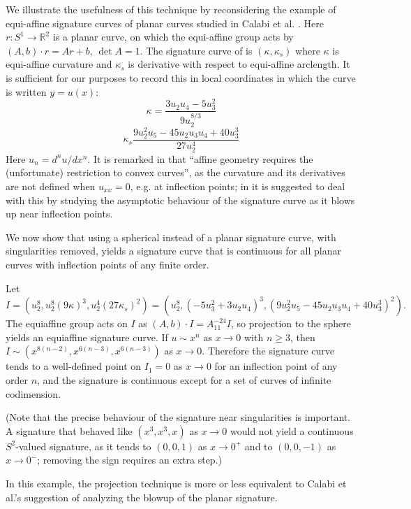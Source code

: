 \documentclass{article}
\def\R{\mathbb{R}}
\begin{document}
We illustrate the usefulness of this technique by reconsidering the example of equi-affine signature curves
of planar curves studied in Calabi et al. \cite{calabi}. Here $r\colon S^1\to\R^2$ is a planar curve, on 
which the equi-affine group acts by $(A,b)\cdot r = A r + b$, $\det A = 1$. The signature curve
of \cite{calabi} is $(\kappa,\kappa_s)$ where $\kappa$ is equi-affine curvature and $\kappa_s$
is derivative with respect to equi-affine arclength. It is sufficient for our purposes to record
this in local coordinates in which the curve is written $y=u(x)$:
$$\kappa = \frac{3 u_2 u_4 - 5 u_3^2}{9 u_2^{8/3}}$$
$$\kappa_s  \frac{9 u_2^2 u_5 - 45 u_2 u_3 u_4 + 40 u_3^3}{27 u_2^4}$$
Here $u_n = d^n u/dx^n$.
It is remarked in \cite{calabi}  that ``affine geometry requires the (unfortunate) restriction to convex curves'',
as the curvature and its derivatives are not defined when $u_{xx}=0$, e.g. at inflection points; in \cite{calabi} 
it is suggested to deal with this by studying the asymptotic behaviour of the signature curve as it blows
up near inflection points. 

We now show that using a spherical instead of a planar signature curve, with singularities removed,
yields a signature curve that is continuous for all planar curves with inflection points of any finite order.

Let
$$ I = (u_2^8, u_2^8(9\kappa)^3, u_2^4 (27\kappa_s)^2) = (u_2^8, (-5 u_3^2 + 3 u_2 u_4)^3,(9 u_2^2 u_5 - 45 u_2 u_3 u_4 + 40 u_3^3)^2).$$
The equiaffine group acts on $I$ as $(A,b)\cdot I = A_{11}^{-24}I$, so projection 
to the sphere yields an equiaffine signature curve. If $u\sim x^n$ as $x\to 0$ with $n\ge 3$, then
$I\sim(x^{8(n-2)}, x^{6(n-3)},x^{6(n-3)})$ as $x\to 0$. Therefore the signature curve
tends to a well-defined point on $I_1=0$ as $x\to 0$ for an inflection point
of any order $n$, and the signature is continuous except for a set of 
curves of infinite codimension.

(Note that the precise behaviour of the signature near singularities is important. A signature
that behaved like $(x^3, x^3, x)$ as $x\to 0$ would not yield a continuous $S^2$-valued signature,
as it tends to $(0,0,1)$ as $x\to 0^+$ and to $(0,0,-1)$ as $x\to 0^-$; removing the sign requires an extra step.)

In this example, the projection technique is more or less equivalent to
Calabi et al.'s suggestion of analyzing the blowup of the planar signature. 
\end{document}
